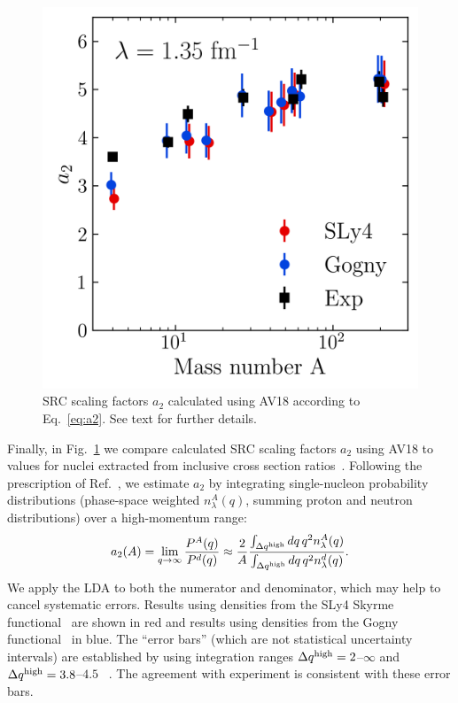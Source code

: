 \documentclass[10pt,aps,prc,floatfix,twocolumn,nofootinbib]{revtex4-1}
\begin{document}
\begin{figure}[tbh]
    \centering
\includegraphics[width=0.82\columnwidth]{figures_low_res/a2_errorbars.png}
    \caption{SRC scaling factors $a_2$ calculated using AV18 according to Eq.~\eqref{eq:a2}. See text for further details.}
    \label{fig:src_scaling_factors_a2}
\end{figure}

Finally, in Fig.~\ref{fig:src_scaling_factors_a2} we compare calculated SRC scaling factors $a_2$ using AV18 to values for nuclei extracted from inclusive cross section ratios~\cite{Fomin:2011ng,Schmookler:2019nvf}.
Following the prescription of Ref.~\cite{Ryckebusch:2019oya}, we estimate $a_2$ by integrating single-nucleon probability distributions (phase-space weighted $n_{\lambda}^A(q)$, summing proton and neutron distributions) over a high-momentum range:
%
\begin{align}
    \label{eq:a2}
    a_2(A) = \lim_{q\to\infty} \frac{P^A(q)}{P^d(q)} \approx \frac{2}{A} \frac{\int_{\Delta q^{\rm high}} dq\, q^2 n_{\lambda}^A(q)}{\int_{\Delta q^{\rm high}} dq\, q^2 n_{\lambda}^d(q)}.
\end{align}
%
We apply the LDA to both the numerator and denominator, which may help to cancel systematic errors.
Results using densities from the SLy4 Skyrme functional~\cite{Chabanat:1997un} are shown in red and results using densities from the Gogny functional~\cite{Decharge:1979fa} in blue.
The ``error bars'' (which are not statistical uncertainty intervals) are established by using integration ranges $\Delta q^{\rm high} = 2$--$\infty$ \fmi and  $\Delta q^{\rm high} = 3.8$--$4.5$ \fmi~\cite{Ryckebusch:2019oya}.
The agreement with experiment is consistent with these error bars.
\end{document}
